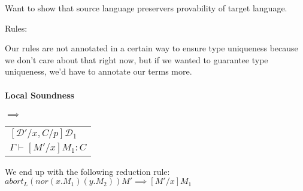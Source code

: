 \documentclass[12 pt]{article}
\begin{document}
       Want to show that source language preservers provability of
       target language.

       Rules:

       \begin{prooftree}
       \end{prooftree}
       \begin{prooftree}
       \end{prooftree}
       \begin{prooftree}
       \end{prooftree}
       \begin{prooftree}
       \end{prooftree}
       \begin{prooftree}
       \end{prooftree}
       Our rules are not annotated in a certain way to ensure type
       uniqueness because we don't care about that right now, but if
       we wanted to guarantee type uniqueness, we'd have to annotate
       our terms more.
       \paragraph{Local Soundness}
       \begin{center}
         \noLine
         \noLine
         \noLine
         \DP
         $\implies$
         \begin{tabular}{l}
           $[\mathcal{D}'/x, C/p] \mathcal{D}_1$
           \\ $\Gamma \vdash [M'/x]M_1 : C$
         \end{tabular}
       \end{center}
       We end up with the following reduction rule:
       \\ $abort_L (nor(x.M_1) (y.M_2))M' \implies [M'/x]M_1$
       
\end{document}
